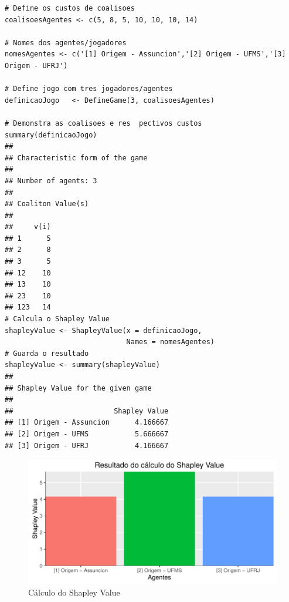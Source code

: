 \documentclass[
	article,			        %
	11pt,				          %
	oneside,			        %
	a4paper,			        %
	english,			        %
	brazil,				        %
	sumario=tradicional
]{abntex2}\usepackage[]{graphicx}\usepackage[]{color}
\makeatletter
\def\maxwidth{ %
  \ifdim\Gin@nat@width>\linewidth
    \linewidth
  \else
    \Gin@nat@width
  \fi
}
\newenvironment{kframe}{%
 \def\at@end@of@kframe{}%
 \ifinner\ifhmode%
  \def\at@end@of@kframe{\end{minipage}}%
  \begin{minipage}{\columnwidth}%
 \fi\fi%
 \def\FrameCommand##1{\hskip\@totalleftmargin \hskip-\fboxsep
 \colorbox{shadecolor}{##1}\hskip-\fboxsep
     \hskip-\linewidth \hskip-\@totalleftmargin \hskip\columnwidth}%
 \MakeFramed {\advance\hsize-\width
   \@totalleftmargin\z@ \linewidth\hsize
   \@setminipage}}%
 {\par\unskip\endMakeFramed%
 \at@end@of@kframe}
\newenvironment{knitrout}{}{} %
\makeatother
\begin{document}
\begin{knitrout}
\color{fgcolor}\begin{kframe}
\begin{verbatim}
# Define os custos de coalisoes
coalisoesAgentes <- c(5, 8, 5, 10, 10, 10, 14)

# Nomes dos agentes/jogadores
nomesAgentes <- c('[1] Origem - Assuncion','[2] Origem - UFMS','[3] Origem - UFRJ')

# Define jogo com tres jogadores/agentes
definicaoJogo   <- DefineGame(3, coalisoesAgentes)

# Demonstra as coalisoes e res  pectivos custos
summary(definicaoJogo)
## 
## Characteristic form of the game 
## 
## Number of agents: 3 
## 
## Coaliton Value(s) 
## 
##     v(i)
## 1      5
## 2      8
## 3      5
## 12    10
## 13    10
## 23    10
## 123   14
# Calcula o Shapley Value
shapleyValue <- ShapleyValue(x = definicaoJogo, 
                             Names = nomesAgentes)
# Guarda o resultado
shapleyValue <- summary(shapleyValue)
## 
## Shapley Value for the given game 
## 
##                        Shapley Value
## [1] Origem - Assuncion      4.166667
## [2] Origem - UFMS           5.666667
## [3] Origem - UFRJ           4.166667
\end{verbatim}
\end{kframe}
\end{knitrout}

\begin{knitrout}
\color{fgcolor}\begin{figure}[h]

{\centering \includegraphics[width=\maxwidth]{figure/unnamed-chunk-4-1} 

}

\caption[Cálculo do Shapley Value]{Cálculo do Shapley Value}\label{fig:unnamed-chunk-4}
\end{figure}


\end{knitrout}
\end{document}
